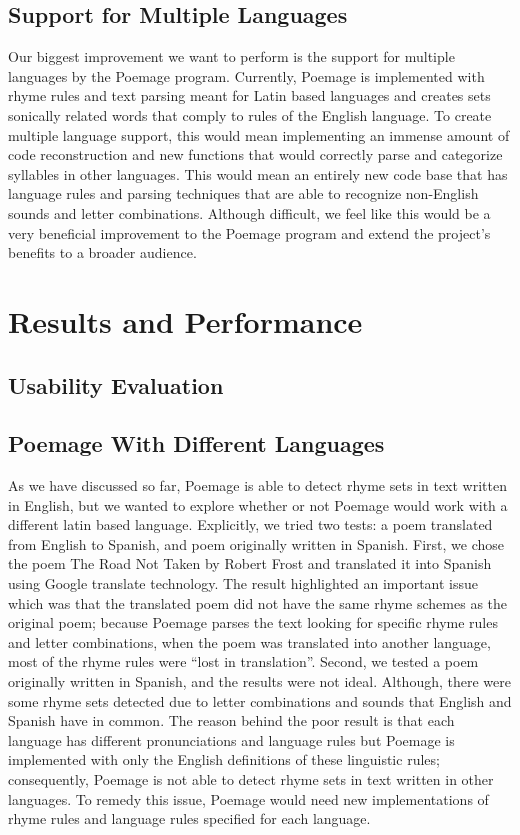 \documentclass[journal]{vgtc}                %
\begin{document}
\subsection{Support for Multiple Languages}
Our biggest improvement we want to perform is the support for multiple languages by the Poemage program. Currently, Poemage is implemented with rhyme rules and text parsing meant for Latin based languages and creates sets sonically related words that comply to rules of the English language. To create multiple language support, this would mean implementing an immense amount of code reconstruction and new functions that would correctly parse and categorize syllables in other languages. This would mean an entirely new code base that has language rules and parsing techniques that are able to recognize non-English sounds and letter combinations. Although difficult, we feel like this would be a very beneficial improvement to the Poemage program and extend the project’s benefits to a broader audience.

\section{Results and Performance} \label{results}
\subsection{Usability Evaluation}
\subsection{Poemage With Different Languages}
As we have discussed so far, Poemage is able to detect rhyme sets in text written in English, but we wanted to explore whether or not Poemage would work with a different latin based language. Explicitly, we tried two tests: a poem translated from English to Spanish, and poem originally written in Spanish. First, we chose the poem The Road Not Taken by Robert Frost and translated it into Spanish using Google translate technology. The result highlighted an important issue which was that the translated poem did not have the same rhyme schemes as the original poem; because Poemage parses the text looking for specific rhyme rules and letter combinations, when the poem was translated into another language, most of the rhyme rules were ``lost in translation''. Second, we tested a poem originally written in Spanish, and the results were not ideal. Although, there were some rhyme sets detected due to letter combinations and sounds that English and Spanish have in common. The reason behind the poor result is that each language has different pronunciations and language rules but Poemage is implemented with only the English definitions of these linguistic rules; consequently, Poemage is not able to detect rhyme sets in text written in other languages. To remedy this issue, Poemage would need new implementations of rhyme rules and language rules specified for each language.
\end{document}

